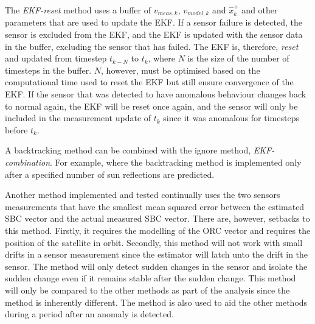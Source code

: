 \documentclass[letterpaper, 10 pt, conference]{ieeeconf}  %
\begin{document}

The \emph{EKF-reset} method uses a buffer of $v_{meas,k}$, $v_{model,k}$ and $\hat{x}_k^+$ and other parameters that are used to update the EKF. If a sensor failure is detected, the sensor is excluded from the EKF, and the EKF is updated with the sensor data in the buffer, excluding the sensor that has failed. The EKF is, therefore, \emph{reset} and updated from timestep $t_{k-N}$ to $t_k$, where $N$ is the size of the number of timesteps in the buffer. $N$, however, must be optimised based on the computational time used to reset the EKF but still ensure convergence of the EKF. If the sensor that was detected to have anomalous behaviour changes back to normal again, the EKF will be reset once again, and the sensor will only be included in the measurement update of $t_k$ since it was anomalous for timesteps before $t_k$.

A backtracking method can be combined with the ignore method, \emph{EKF-combination}. For example, where the backtracking method is implemented only after a specified number of sun reflections are predicted.

Another method implemented and tested continually uses the two sensors measurements that have the smallest mean squared error between the estimated SBC vector and the actual measured SBC vector. There are, however, setbacks to this method. Firstly, it requires the modelling of the ORC vector and requires the position of the satellite in orbit. Secondly, this method will not work with small drifts in a sensor measurement since the estimator will latch unto the drift in the sensor. The method will only detect sudden changes in the sensor and isolate the sudden change even if it remains stable after the sudden change. This method will only be compared to the other methods as part of the analysis since the method is inherently different. The method is also used to aid the other methods during a period after an anomaly is detected.
\end{document}
